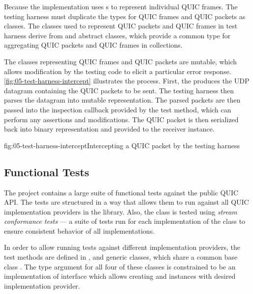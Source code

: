 Because the \ManagedQuicConnection{} implementation uses s to represent
individual QUIC frames. The testing harness must duplicate the types for QUIC frames and QUIC
packets as classes. The classes used to represent QUIC packets and QUIC frames in test harness
derive from  and  abstract classes, which provide a common type
for aggregating QUIC packets and QUIC frames in collections.

The classes representing QUIC frames and QUIC packets are mutable, which allows modification by the
testing code to elicit a particular error response. \autoref{fig:05-test-harness-intercept}
illustrates the process. First, the \ManagedQuicConnection{} produces the UDP datagram containing
the QUIC packets to be sent. The testing harness then parses the datagram into mutable
representation. The parsed packets are then passed into the inspection callback provided by the test
method, which can perform any assertions and modifications. The QUIC packet is then serialized back
into binary representation and provided to the receiver \ManagedQuicConnection{} instance.

\begin{myFigure}{fig:05-test-harness-intercept}{Intercepting a QUIC packet by the testing harness}

  \resizebox{\textwidth}{!}{}

\end{myFigure}

\subsection{Functional Tests}

The  project contains a large suite of functional tests against the public
QUIC API\@. The tests are structured in a way that allows them to run against all QUIC implementation
providers in the library. Also, the \QuicStream{} class is tested using \textit{stream conformance
tests} --- a suite of tests run for each implementation of the \Stream{} class to ensure consistent
behavior of all implementations.

In order to allow running tests against different implementation providers, the test methods are
defined in \QuicListenerTests{}, \QuicConnectionTests{} and \QuicStreamTests{} generic classes,
which share a common base class \QuicTestBase{}. The type argument for all four of these classes is
constrained to be an implementation of  interface which allows
creating \QuicListener{} and \QuicConnection{} instances with desired implementation provider.

